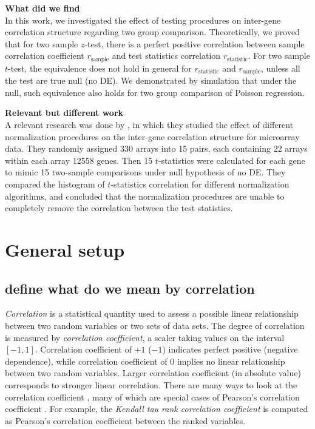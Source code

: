 \documentclass[12pt, a4paper]{article}
\begin{document}
	
		\textbf{What did we find}\\
		In this work, we investigated the effect of testing procedures on inter-gene correlation structure
		regarding two group comparison. Theoretically, we proved that for two sample $z$-test, there is a
		perfect positive correlation between sample correlation coefficient $r_{\text{sample}}$ and test
		statistics correlation $r_{\text{statistic}}$. For two sample $t$-test, the equivalence does not
		hold in general for $r_{\text{statistic}}$ and $r_{\text{sample}}$, unless all the test are true
		null (no DE).  We demonstrated by simulation that under the null, such equivalence also holds for
		two group comparison of Poisson regression. 
		
		
	
	\textbf{Relevant but different work}\\
	A relevant research was done by \citet{qiu2005effects}, in which they studied the effect of different
	normalization procedures on the inter-gene correlation structure for microarray data. They randomly
	assigned 330 arrays into 15 pairs, each containing 22 arrays within each array 12558 genes. Then 15
	$t$-statistics were calculated for each gene to mimic 15 two-sample comparisons under null
	hypothesis of no DE. They compared the histogram of $t$-statistics correlation for different
	normalization algorithms, and concluded that the normalization procedures are unable to completely
	remove the correlation between the test statistics. %
	

	
	
	
	
	
	\section{General setup}
	
	\subsection{define what do we mean by correlation}
	\textit{Correlation} is a statistical quantity used to assess a possible linear relationship between two random variables or two sets of 
	data sets. The degree of correlation is measured by \textit{correlation coefficient}, a scaler taking values on the interval $[-1, 1]$. 
	Correlation coefficient of $+1$ ($-1$) indicates perfect positive (negative dependence), while correlation coefficient of 0 implies no linear 
	relationship between two random variables. Larger correlation coefficient (in absolute value) corresponds to stronger linear correlation. 
	There are many ways to look at the correlation coefficient , many of which are special cases of Pearson's correlation coefficient 
	\citep{lee1988thirteen}. For example, the \textit{Kendall tau rank correlation coefficient} is computed as Pearson's correlation coefficient 
	between the ranked variables.
	
\end{document}
